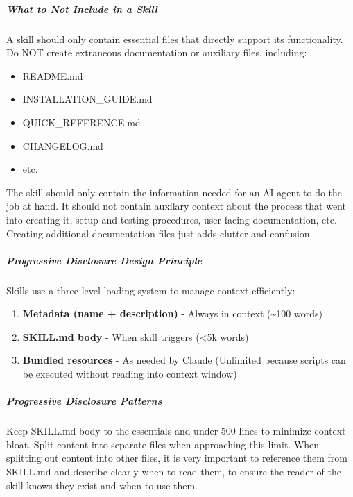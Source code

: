 \documentclass[11pt]{article}
\begin{document}
\subparagraph{What to Not Include in a Skill}\mbox{}\par

A skill should only contain essential files that directly support its functionality. Do NOT create extraneous documentation or auxiliary files, including:


\begin{itemize}[leftmargin=*,itemsep=2pt,topsep=2pt]
\item {} README.md
\item {} INSTALLATION\_\allowbreak{}GUIDE.md
\item {} QUICK\_\allowbreak{}REFERENCE.md
\item {} CHANGELOG.md
\item {} etc.
\end{itemize}

The skill should only contain the information needed for an AI agent to do the job at hand. It should not contain auxilary context about the process that went into creating it, setup and testing procedures, user-facing documentation, etc. Creating additional documentation files just adds clutter and confusion.


\subparagraph{Progressive Disclosure Design Principle}\mbox{}\par

Skills use a three-level loading system to manage context efficiently:


\begin{enumerate}[leftmargin=*,itemsep=2pt,topsep=2pt]
\item {} \textbf{Metadata (name + description)} - Always in context (\textasciitilde{}100 words)
\item {} \textbf{SKILL.md body} - When skill triggers (<5k words)
\item {} \textbf{Bundled resources} - As needed by Claude (Unlimited because scripts can be executed without reading into context window)
\end{enumerate}

\subparagraph{Progressive Disclosure Patterns}\mbox{}\par

Keep SKILL.md body to the essentials and under 500 lines to minimize context bloat. Split content into separate files when approaching this limit. When splitting out content into other files, it is very important to reference them from SKILL.md and describe clearly when to read them, to ensure the reader of the skill knows they exist and when to use them.
\end{document}
